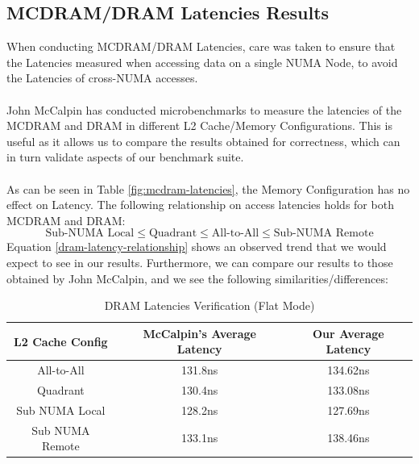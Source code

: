 \documentclass[bsc,frontabs,twoside,singlespacing,parskip,deptreport]{infthesis}     %
\begin{document}
\subsection{MCDRAM/DRAM Latencies Results}
When conducting MCDRAM/DRAM Latencies, care was taken to ensure that the Latencies measured when accessing data on a single NUMA Node, to avoid the Latencies of cross-NUMA accesses. \\
\\
John McCalpin has conducted microbenchmarks to measure the latencies of the MCDRAM and DRAM in different L2 Cache/Memory Configurations\cite{mccalpin_results}. This is useful as it allows us to compare the results obtained for correctness, which can in turn validate aspects of our benchmark suite. \\
\\
As can be seen in Table \ref{fig:mcdram-latencies}, the Memory Configuration has no effect on Latency. The following relationship on access latencies holds for both MCDRAM and DRAM:
\begin{equation}\label{dram-latency-relationship}
\textrm{Sub-NUMA Local} \leq \textrm{Quadrant} \leq \textrm{All-to-All} \leq \textrm{Sub-NUMA Remote}
\end{equation}
Equation \ref{dram-latency-relationship} shows an observed trend that we would expect to see in our results. Furthermore, we can compare our results to those obtained by John McCalpin, and we see the following similarities/differences:

\begin{table}[!h]
\begin{center}
\caption{DRAM Latencies Verification (Flat Mode)}
\label{fig:dram-latencies-verification}
\begin{tabular}{ |c|c|c| } 
    \hline
    L2 Cache Config & McCalpin's Average Latency & Our Average Latency \\
    \hline
    All-to-All      & 131.8ns  & 134.62ns \\
    Quadrant        & 130.4ns  & 133.08ns \\
    Sub NUMA Local  & 128.2ns  & 127.69ns \\
    Sub NUMA Remote & 133.1ns  & 138.46ns \\
    \hline
\end{tabular}
\end{center}
\end{table}
\end{document}
